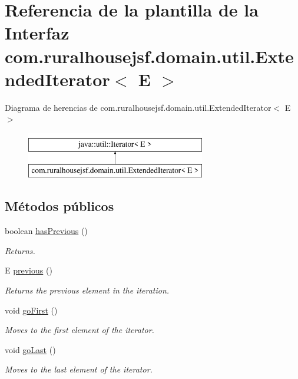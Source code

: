 \hypertarget{a00192}{}\section{Referencia de la plantilla de la Interfaz com.\+ruralhousejsf.\+domain.\+util.\+Extended\+Iterator$<$ E $>$}
\label{a00192}
Diagrama de herencias de com.\+ruralhousejsf.\+domain.\+util.\+Extended\+Iterator$<$ E $>$\begin{figure}[H]
\begin{center}
\leavevmode
\includegraphics[height=2.000000cm]{a00192}
\end{center}
\end{figure}
\subsection*{Métodos públicos}
\begin{DoxyCompactItemize}
\item 
boolean \mbox{\hyperlink{a00192_a8aa41cc3f69db973663cf92a484579a9}{has\+Previous}} ()
\begin{DoxyCompactList}\small\item\em Returns. \end{DoxyCompactList}\item 
E \mbox{\hyperlink{a00192_a4c9f9f5da6e96c08bc44d55517689397}{previous}} ()
\begin{DoxyCompactList}\small\item\em Returns the previous element in the iteration. \end{DoxyCompactList}\item 
void \mbox{\hyperlink{a00192_a1a2554fbed6834a638e31a23b739a684}{go\+First}} ()
\begin{DoxyCompactList}\small\item\em Moves to the first element of the iterator. \end{DoxyCompactList}\item 
void \mbox{\hyperlink{a00192_a055883d2a28df4ac0da7476a2a773f36}{go\+Last}} ()
\begin{DoxyCompactList}\small\item\em Moves to the last element of the iterator. \end{DoxyCompactList}\end{DoxyCompactItemize}


